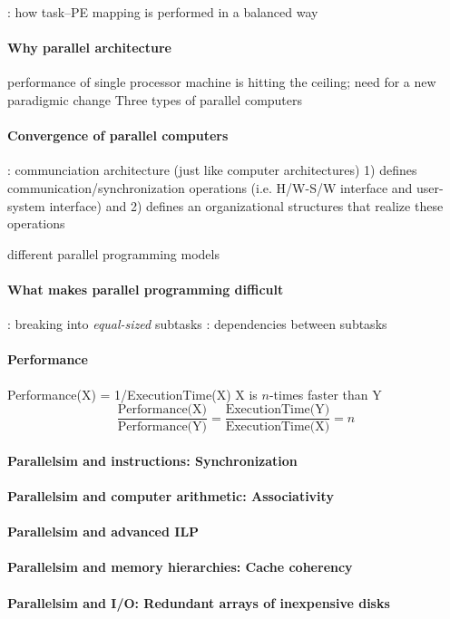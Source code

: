 \documentclass{myproc}
\begin{document}
\w {}: how task--PE mapping is performed in a balanced way 
\eit

\paragraph{Why parallel architecture}
\bit
\w performance of single processor machine is hitting the ceiling; need for a
new paradigmic change
\w Three types of parallel computers
  \bit
  \w {}
  \w {}
  \w {}
  \eit
\eit

\paragraph{Convergence of parallel computers}
\bit
\w {}: 
    communciation architecture (just like computer architectures) 1) defines
   communication/synchronization operations (i.e. H/W-S/W interface and
   user-system interface) and 2) defines an organizational structures that
   realize these operations

\w different parallel programming models
      \bit
      \w {}
      \w {}
      \w {}
      \eit
\eit

\paragraph{What makes parallel programming difficult}
\bit
\w {}: breaking into {\em equal-sized\/} subtasks
\w {}: dependencies between subtasks
\w {}
\w {}
\eit

\paragraph{Performance}
\bit
\w Performance(X) = 1/ExecutionTime(X)
\w X is $n$-times faster than Y
   \[ \frac{\mbox{Performance(X)}}{\mbox{Performance(Y)}} = 
      \frac{\mbox{ExecutionTime(Y)}}{\mbox{ExecutionTime(X)}} = n\]
\eit

\paragraph{Parallelsim and instructions: Synchronization}
\paragraph{Parallelsim and computer arithmetic: Associativity}
\paragraph{Parallelsim and advanced ILP}
\paragraph{Parallelsim and memory hierarchies: Cache coherency}
\paragraph{Parallelsim and I/O: Redundant arrays of inexpensive disks}



%
%
\end{document}
